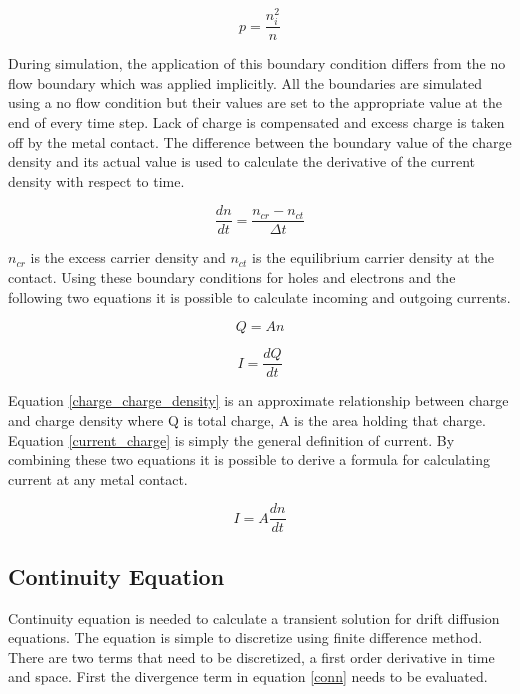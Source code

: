 \begin{equation}
p=\frac{n_i^2}{n}
\label{pbound}
\end{equation}


During simulation, the application of this boundary condition differs from the no flow boundary which was applied implicitly. All the boundaries are simulated using a no flow condition but their values are set to the appropriate value at the end of every time step. Lack of charge is compensated and excess charge is taken off by the metal contact. The difference between the boundary value of the charge density and its actual value is used to calculate the derivative of the current density with respect to time.

\begin{equation}
\frac{dn}{dt}=\frac{n_{cr}-n_{ct}}{\Delta t}
\end{equation}

$n_{cr}$ is the excess carrier density and $n_{ct}$ is the equilibrium carrier density at the contact. Using these boundary conditions for holes and electrons and the following two equations it is possible to calculate incoming and outgoing currents. 

\begin{equation}
Q=An
\label{charge_charge_density}
\end{equation} 

\begin{equation}
I=\frac{dQ}{dt}
\label{current_charge}
\end{equation} 
 

Equation \ref{charge_charge_density} is an approximate relationship between charge and charge density where Q is total charge, A is the area holding that charge. Equation \ref{current_charge} is simply the general definition of current. By combining these two equations it is possible to derive a formula for calculating current at any metal contact.

\begin{equation}
I=A \frac{dn}{dt}
\label{current_charge_density}
\end{equation}


\clearpage
\subsection{Continuity Equation}
Continuity equation is needed to calculate a transient solution for drift diffusion equations. The equation is simple to discretize using finite difference method. There are two terms that need to be discretized, a first order derivative in time and space. First the divergence term in equation \eqref{conn} needs to be evaluated.

